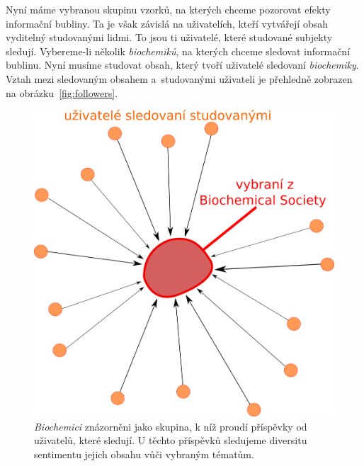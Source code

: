 \documentclass[12pt, a4paper]{article}
\numberwithin{equation}{section} 	%
\begin{document}
Nyní máme vybranou skupinu vzorků, na kterých chceme pozorovat efekty informační bubliny. Ta je však závislá na uživatelích, kteří vytvářejí obsah vyditelný studovanými lidmi. To jsou ti uživatelé, které studované subjekty sledují. Vybereme-li několik \textit{biochemiků}, na kterých chceme sledovat informační bublinu. Nyní musíme studovat obsah, který tvoří uživatelé sledovaní \textit{biochemiky}. Vztah mezi sledovaným obsahem a~studovanými uživateli je přehledně zobrazen na obrázku~\autoref{fig:followers}.
\begin{figure}[h]
\centering
\includegraphics[scale=0.35]{./Pics/followers.png}
    \caption{\textit{Biochemici} znázorněni jako skupina, k níž proudí příspěvky od uživatelů, které sledují. U těchto příspěvků sledujeme diversitu sentimentu jejich obsahu vůči vybraným tématům.}
\label{fig:followers}
\end{figure}
\end{document}
